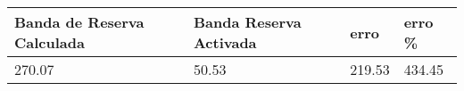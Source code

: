 \begin{tabular}{llll}
\toprule
Banda de Reserva Calculada & Banda Reserva Activada & erro & erro \% \\
\midrule
270.07 & 50.53 & 219.53 & 434.45 \\
\bottomrule
\end{tabular}
